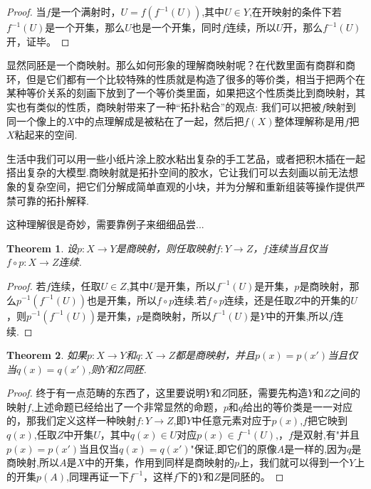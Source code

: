 \documentclass{article}
\newtheorem{theorem}{Theorem}[section]
\newcommand*{\xfunc}[4]{{#2}\colon{#3}{#1}{#4}}
\newcommand*{\func}[3]{\xfunc{\to}{#1}{#2}{#3}}
\begin{document}
\begin{proof}
当$f$是一个满射时，$U=f(f^{-1}(U))$,其中$U \in Y$,在开映射的条件下若$f^{-1}(U)$是一个开集，那么$U$也是一个开集，同时$f$连续，所以$U$开，那么$f^{-1}(U)$开，证毕。
\end{proof}

显然同胚是一个商映射。那么如何形象的理解商映射呢？在代数里面有商群和商环，但是它们都有一个比较特殊的性质就是构造了很多的等价类，相当于把两个在某种等价关系的刻画下放到了一个等价类里面，如果把这个性质类比到商映射，其实也有类似的性质，商映射带来了一种“拓扑粘合”的观点: 我们可以把被$f$映射到同一个像上的$X$中的点理解成是被粘在了一起，然后把$f(X)$整体理解称是用$f$把$X$粘起来的空间.

生活中我们可以用一些小纸片涂上胶水粘出复杂的手工艺品，或者把积木插在一起搭出复杂的大模型.商映射就是拓扑空间的胶水，它让我们可以去刻画以前无法想象的复杂空间，把它们分解成简单直观的小块，并为分解和重新组装等操作提供严禁可靠的拓扑解释.

这种理解很是奇妙，需要靠例子来细细品尝...

\begin{theorem}
设$\func{p}{X}{Y}$是商映射，则任取映射$\func{f}{Y}{Z}$，$f$连续当且仅当$\func{f \circ p}{X}{Z}$连续.
\end{theorem}

\begin{proof}
若$f$连续，任取$U \in Z$,其中$U$是开集，所以$f^{-1}(U)$是开集，$p$是商映射，那么$p^{-1}(f^{-1}(U))$也是开集，所以$f \circ p$连续.若$f \circ p$连续，还是任取$Z$中的开集的$U$，则$p^{-1}(f^{-1}(U))$是开集，$p$是商映射，所以$f^{-1}(U)$是$Y$中的开集,所以$f$连续.
\end{proof}

\begin{theorem}
如果$\func{p}{X}{Y}$和$\func{q}{X}{Z}$都是商映射，并且$p(x)=p(x')$当且仅当$q(x)=q(x')$,则$Y$和$Z$同胚.
\begin{center}
\end{center}
\end{theorem}

\begin{proof}
终于有一点范畴的东西了，这里要说明$Y$和$Z$同胚，需要先构造$Y$和$Z$之间的映射$f$,上述命题已经给出了一个非常显然的命题，$p$和$q$给出的等价类是一一对应的，那我们定义这样一种映射$\func{f}{Y}{Z}$,即$Y$中任意元素对应于$p(x)$,$f$把它映到$q(x)$,任取$Z$中开集$U$，其中$q(x) \in U$对应$p(x) \in f^{-1}(U)$,，$f$是双射,有"并且$p(x)=p(x')$当且仅当$q(x)=q(x')$"保证,即它们的原像$A$是一样的,因为$q$是商映射,所以$A$是$X$中的开集，作用到同样是商映射的$p$上，我们就可以得到一个$Y$上的开集$p(A)$,同理再证一下$f^{-1}$，这样$f$下的$Y$和$Z$是同胚的。
\end{proof}
\end{document}
